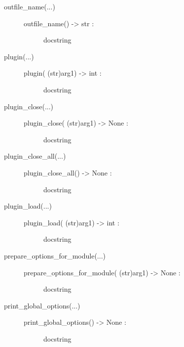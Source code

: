 \documentclass[letterpaper,10pt,english]{sphinxmanual}
\begin{document}
\begin{description}
\begin{description}
\begin{description}
\end{description}

\item[{outfile\_name(...)}] \leavevmode\begin{description}
\item[{outfile\_name() -\textgreater{} str :}] \leavevmode
docstring

\end{description}

\item[{plugin(...)}] \leavevmode\begin{description}
\item[{plugin( (str)arg1) -\textgreater{} int :}] \leavevmode
docstring

\end{description}

\item[{plugin\_close(...)}] \leavevmode\begin{description}
\item[{plugin\_close( (str)arg1) -\textgreater{} None :}] \leavevmode
docstring

\end{description}

\item[{plugin\_close\_all(...)}] \leavevmode\begin{description}
\item[{plugin\_close\_all() -\textgreater{} None :}] \leavevmode
docstring

\end{description}

\item[{plugin\_load(...)}] \leavevmode\begin{description}
\item[{plugin\_load( (str)arg1) -\textgreater{} int :}] \leavevmode
docstring

\end{description}

\item[{prepare\_options\_for\_module(...)}] \leavevmode\begin{description}
\item[{prepare\_options\_for\_module( (str)arg1) -\textgreater{} None :}] \leavevmode
docstring

\end{description}

\item[{print\_global\_options(...)}] \leavevmode\begin{description}
\item[{print\_global\_options() -\textgreater{} None :}] \leavevmode
docstring


\end{description}
\end{description}
\end{description}
\end{document}
